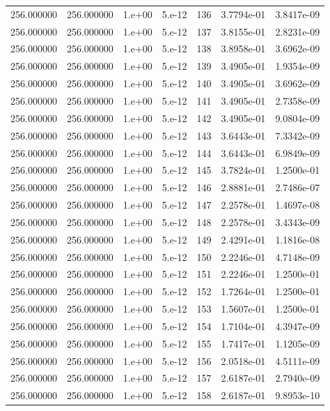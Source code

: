 \begin{table}[htbp]
\begin{tabular}{rrrrrrr}
256.000000 & 256.000000 & 1.e+00 & 5.e-12 & 136 & 3.7794e-01 & 3.8417e-09 \\
256.000000 & 256.000000 & 1.e+00 & 5.e-12 & 137 & 3.8155e-01 & 2.8231e-09 \\
256.000000 & 256.000000 & 1.e+00 & 5.e-12 & 138 & 3.8958e-01 & 3.6962e-09 \\
256.000000 & 256.000000 & 1.e+00 & 5.e-12 & 139 & 3.4905e-01 & 1.9354e-09 \\
256.000000 & 256.000000 & 1.e+00 & 5.e-12 & 140 & 3.4905e-01 & 3.6962e-09 \\
256.000000 & 256.000000 & 1.e+00 & 5.e-12 & 141 & 3.4905e-01 & 2.7358e-09 \\
256.000000 & 256.000000 & 1.e+00 & 5.e-12 & 142 & 3.4905e-01 & 9.0804e-09 \\
256.000000 & 256.000000 & 1.e+00 & 5.e-12 & 143 & 3.6443e-01 & 7.3342e-09 \\
256.000000 & 256.000000 & 1.e+00 & 5.e-12 & 144 & 3.6443e-01 & 6.9849e-09 \\
256.000000 & 256.000000 & 1.e+00 & 5.e-12 & 145 & 3.7824e-01 & 1.2500e-01 \\
256.000000 & 256.000000 & 1.e+00 & 5.e-12 & 146 & 2.8881e-01 & 2.7486e-07 \\
256.000000 & 256.000000 & 1.e+00 & 5.e-12 & 147 & 2.2578e-01 & 1.4697e-08 \\
256.000000 & 256.000000 & 1.e+00 & 5.e-12 & 148 & 2.2578e-01 & 3.4343e-09 \\
256.000000 & 256.000000 & 1.e+00 & 5.e-12 & 149 & 2.4291e-01 & 1.1816e-08 \\
256.000000 & 256.000000 & 1.e+00 & 5.e-12 & 150 & 2.2246e-01 & 4.7148e-09 \\
256.000000 & 256.000000 & 1.e+00 & 5.e-12 & 151 & 2.2246e-01 & 1.2500e-01 \\
256.000000 & 256.000000 & 1.e+00 & 5.e-12 & 152 & 1.7264e-01 & 1.2500e-01 \\
256.000000 & 256.000000 & 1.e+00 & 5.e-12 & 153 & 1.5607e-01 & 1.2500e-01 \\
256.000000 & 256.000000 & 1.e+00 & 5.e-12 & 154 & 1.7104e-01 & 4.3947e-09 \\
256.000000 & 256.000000 & 1.e+00 & 5.e-12 & 155 & 1.7417e-01 & 1.1205e-09 \\
256.000000 & 256.000000 & 1.e+00 & 5.e-12 & 156 & 2.0518e-01 & 4.5111e-09 \\
256.000000 & 256.000000 & 1.e+00 & 5.e-12 & 157 & 2.6187e-01 & 2.7940e-09 \\
256.000000 & 256.000000 & 1.e+00 & 5.e-12 & 158 & 2.6187e-01 & 9.8953e-10 \\

\end{tabular}
\end{table}

